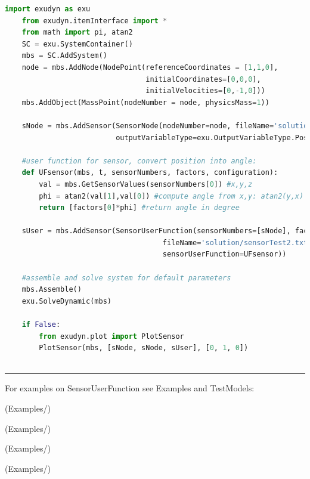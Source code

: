     \begin{lstlisting}[language=Python]
    import exudyn as exu
    from exudyn.itemInterface import *
    from math import pi, atan2
    SC = exu.SystemContainer()
    mbs = SC.AddSystem()
    node = mbs.AddNode(NodePoint(referenceCoordinates = [1,1,0], 
                                 initialCoordinates=[0,0,0],
                                 initialVelocities=[0,-1,0]))
    mbs.AddObject(MassPoint(nodeNumber = node, physicsMass=1))
    
    sNode = mbs.AddSensor(SensorNode(nodeNumber=node, fileName='solution/sensorTest.txt',
                          outputVariableType=exu.OutputVariableType.Position))

    #user function for sensor, convert position into angle:
    def UFsensor(mbs, t, sensorNumbers, factors, configuration):
        val = mbs.GetSensorValues(sensorNumbers[0]) #x,y,z
        phi = atan2(val[1],val[0]) #compute angle from x,y: atan2(y,x)
        return [factors[0]*phi] #return angle in degree
    
    sUser = mbs.AddSensor(SensorUserFunction(sensorNumbers=[sNode], factors=[180/pi], 
                                     fileName='solution/sensorTest2.txt',
                                     sensorUserFunction=UFsensor))

    #assemble and solve system for default parameters
    mbs.Assemble()
    exu.SolveDynamic(mbs)

    if False:
        from exudyn.plot import PlotSensor
        PlotSensor(mbs, [sNode, sNode, sUser], [0, 1, 0])
    
    \end{lstlisting}
\vspace{6pt}\par\noindent\rule{\textwidth}{0.4pt}
%
\noindent For examples on SensorUserFunction see Examples and TestModels:
\bi
\item {} (Examples/)
\item {} (Examples/)
\item {} (Examples/)
\item {} (Examples/)
